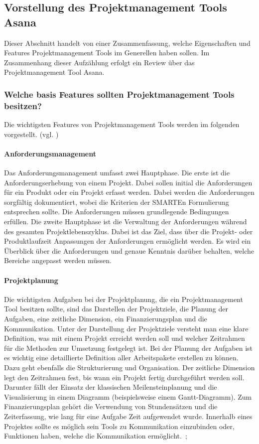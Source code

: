 \documentclass[sigconf, nonacm]{acmart}
\begin{document}
\subsection{Vorstellung des Projektmanagement Tools Asana}
Dieser Abschnitt handelt von einer Zusammenfassung, welche Eigenschaften und Features Projektmanagement Tools im Generellen haben sollen. Im Zusammenhang dieser Aufzählung erfolgt ein Review über das Projektmanagement Tool Asana.
\subsubsection{Welche basis Features sollten Projektmanagement Tools besitzen?}
Die wichtigsten Features von Projektmanagement Tools werden im folgenden vorgestellt. (vgl. \cite{noauthor_projektmanagement_nodate})
\paragraph{Anforderungsmanagement}
Das Anforderungsmanagement umfasst zwei Hauptphase. Die erste ist die Anforderungserhebung von einem Projekt. Dabei sollen initial die Anforderungen für ein Produkt oder ein Projekt erfasst werden. Dabei werden die Anforderungen sorgfältig dokumentiert, wobei die Kriterien der SMARTEn Formulierung entsprechen sollte. Die Anforderungen müssen grundlegende Bedingungen erfüllen.
Die zweite Hauptphase ist die Verwaltung der Anforderungen während des gesamten Projektlebenszyklus.
Dabei ist das Ziel, dass über die Projekt- oder Produktlaufzeit Anpassungen der Anforderungen ermöglicht werden. Es wird ein Überblick über die Anforderungen und genaue Kenntnis darüber behalten, welche Bereiche angepasst werden müssen. ~\citep{venzmer_anforderungsmanagement-tool_2020}
\paragraph{Projektplanung}
Die wichtigsten Aufgaben bei der Projektplanung, die ein Projektmanagement Tool besitzen sollte, sind das Darstellen der Projektziele, die Planung der Aufgaben, eine zeitliche Dimension, ein Finanzierungsplan und die Kommunikation. Unter der Darstellung der Projektziele versteht man eine klare Definition, was mit einem Projekt erreicht werden soll und welcher Zeitrahmen für die Methoden zur Umsetzung festgelegt ist. Bei der Planung der Aufgaben ist es wichtig eine detaillierte Definition aller Arbeitspakete erstellen zu können. Dazu geht ebenfalls die Strukturierung und Organisation. Der zeitliche Dimension legt den Zeitrahmen fest, bis wann ein Projekt fertig durchgeführt werden soll. Darunter fällt der Einsatz der klassischen Meilensteinplanung und die Visualisierung in einem Diagramm (beispielsweise einem Gantt-Diagramm). Zum Finanzierungsplan gehört die Verwendung von Stundensätzen und die Zeiterfassung, wie lang für eine Aufgabe Zeit aufgewendet wurde. Innerhalb eines Projektes sollte es möglich sein Tools zu Kommunikation einzubinden oder, Funktionen haben, welche die Kommunikation ermöglicht.~\citep{venzmer_projektplaner-software_2020};
\end{document}
